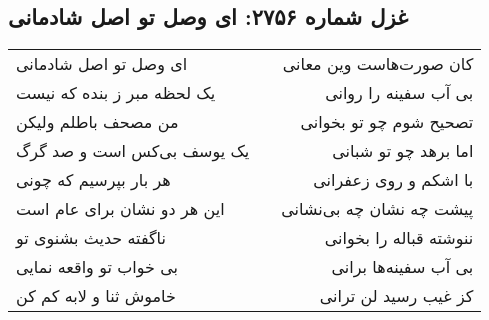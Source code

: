 \begin{center}
\section*{غزل شماره ۲۷۵۶: ای وصل تو اصل شادمانی}
\label{sec:2756}
\begin{longtable}{l p{0.5cm} r}
ای وصل تو اصل شادمانی
&&
کان صورت‌هاست وین معانی
\\
یک لحظه مبر ز بنده که نیست
&&
بی آب سفینه را روانی
\\
من مصحف باطلم ولیکن
&&
تصحیح شوم چو تو بخوانی
\\
یک یوسف بی‌کس است و صد گرگ
&&
اما برهد چو تو شبانی
\\
هر بار بپرسیم که چونی
&&
با اشکم و روی زعفرانی
\\
این هر دو نشان برای عام است
&&
پیشت چه نشان چه بی‌نشانی
\\
ناگفته حدیث بشنوی تو
&&
ننوشته قباله را بخوانی
\\
بی خواب تو واقعه نمایی
&&
بی آب سفینه‌ها برانی
\\
خاموش ثنا و لابه کم کن
&&
کز غیب رسید لن ترانی
\\
\end{longtable}
\end{center}
